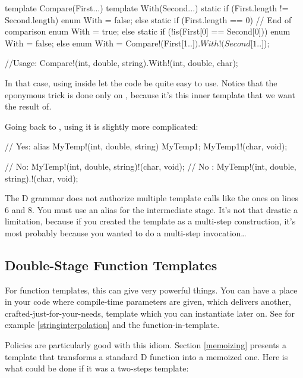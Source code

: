 \begin{dcode}
template Compare(First...)
{
    template With(Second...)
    {
        static if (First.length != Second.length)
            enum With = false;
        else static if (First.length == 0) // End of comparison
            enum With = true;
        else static if (!is(First[0] == Second[0]))
            enum With = false;
        else
            enum With = Compare!(First[1..$]).With!(Second[1..$]);
    }
}

//Usage:
Compare!(int, double, string).With!(int, double, char);
\end{dcode}

In that case, using  inside  let the code be quite easy to use. Notice that the eponymous trick is done only on , because it's this inner template that we want the result of.

Going back to , using it is slightly more complicated:

\begin{ndcode}
// Yes:
alias MyTemp!(int, double, string) MyTemp1;
MyTemp1!(char, void);

// No:
MyTemp!(int, double, string)!(char, void);
// No :
MyTemp!(int, double, string).!(char, void);
\end{ndcode}

The D grammar does not authorize multiple template calls like the ones on lines 6 and 8. You must use an alias for the intermediate stage. It's not that drastic a limitation, because if you created the template as a multi-step construction, it's most probably because you wanted to do a multi-step invocation\ldots

\subsection{Double-Stage Function Templates}

For function templates, this can give very powerful things. You can have a place in your code where compile-time parameters are given, which delivers another, crafted-just-for-your-needs, template which you can instantiate later on. See for example \ref{stringinterpolation} and the  function-in-template.

Policies are particularly good with this idiom. Section \ref{memoizing} presents a template that transforms a standard D function into a memoized one. Here is what could be done if it was a two-steps template:


